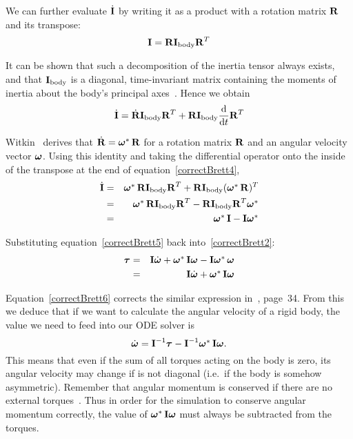We can further evaluate $\dot{\m{I}}$ by writing it as a product with a rotation matrix
$\m{R}$ and its transpose:
\begin{equation}
\label{correctBrett3}
\m{I} = \m{R}\m{I}_\mathrm{body}\m{R}^T
\end{equation}

It can be shown that such a decomposition of the inertia tensor always exists, and that
$\m{I}_\mathrm{body}$ is a diagonal, time-invariant matrix containing the moments
of inertia about the body's principal axes~\cite{Feynman:63}. Hence we obtain
\begin{equation}
\label{correctBrett4}
\dot{\m{I}} = \dot{\m{R}}\m{I}_\mathrm{body}\m{R}^T +
    \m{R}\m{I}_\mathrm{body}\frac{\diff}{\diff t}\m{R}^T
\end{equation}

Witkin~\cite{BaraffWitkin:97} derives that $\dot{\m{R}} = \dual{\ve{\omega}}\,\m{R}$
for a rotation matrix $\m{R}$ and an angular velocity vector $\ve{\omega}$.
Using this identity and taking the differential operator onto the inside of the
transpose at the end of equation~\ref{correctBrett4},
\begin{eqnarray}
\dot{\m{I}} &=& \dual{\ve{\omega}}\,\m{R}\m{I}_\mathrm{body}\m{R}^T +
    \m{R}\m{I}_\mathrm{body}(\dual{\ve{\omega}}\,\m{R})^T \nonumber\\
&=& \dual{\ve{\omega}}\,\m{R}\m{I}_\mathrm{body}\m{R}^T -
    \m{R}\m{I}_\mathrm{body}\m{R}^T\dual{\ve{\omega}} \nonumber\\
&=& \dual{\ve{\omega}}\,\m{I} - \m{I}\dual{\ve{\omega}} \label{correctBrett5}
\end{eqnarray}

Substituting equation~\ref{correctBrett5} back into~\ref{correctBrett2}:
\begin{eqnarray}
\ve{\tau} & = & \m{I}\dot{\ve{\omega}} + \dual{\ve{\omega}}\,\m{I}\ve{\omega} -
    \m{I}\dual{\ve{\omega}}\,\ve{\omega} \nonumber \\
& = & \m{I}\dot{\ve{\omega}} + \dual{\ve{\omega}}\,\m{I}\ve{\omega} \label{correctBrett6}
\end{eqnarray}

Equation~\ref{correctBrett6} corrects the similar expression in~\cite{Saunders:PhD},
page~34. From this we deduce that if we want to calculate the angular velocity of a rigid
body, the value we need to feed into our ODE solver is
\begin{equation}
\dot{\ve{\omega}} = \m{I}^{-1}\ve{\tau} -
    \m{I}^{-1}\dual{\ve{\omega}}\,\m{I}\ve{\omega}.
\end{equation}
This means that even if the sum of all torques acting on the body is zero, its angular
velocity may change if  is not diagonal (i.e.\ if the body is somehow asymmetric).
Remember that angular momentum is conserved if there are no external torques~\cite{Feynman:63}.
Thus in order for the simulation to conserve angular momentum correctly, the value of
$\dual{\ve{\omega}}\,\m{I}\ve{\omega}$ must always be subtracted from the torques.


